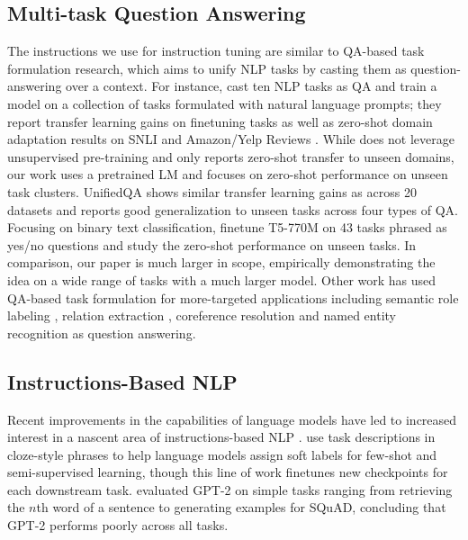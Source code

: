 \subsection{Multi-task Question Answering}
The instructions we use for instruction tuning are similar to QA-based task formulation research, which aims to unify NLP tasks by casting them as question-answering over a context.
For instance, \citet{mccann2018natural} cast ten NLP tasks as QA and train a model on a collection of tasks formulated with natural language prompts;
they report transfer learning gains on finetuning tasks as well as zero-shot domain adaptation results on SNLI \citep{bowman-etal-2015-large} and Amazon/Yelp Reviews \citep{amazonyelp2015}.
While \citet{mccann2018natural} does not leverage unsupervised pre-training and only reports zero-shot transfer to unseen domains, our work uses a pretrained LM and focuses on zero-shot performance on unseen task clusters.
UnifiedQA \citep{khashabi-etal-2020-unifiedqa} shows similar transfer learning gains as \citet{mccann2018natural} across 20 datasets and reports good generalization to unseen tasks across four types of QA. 
Focusing on binary text classification, \citet{zhong2021meta} finetune T5-770M on 43 tasks phrased as yes/no questions and study the zero-shot performance on unseen tasks. 
In comparison, our paper is much larger in scope, empirically demonstrating the idea on a wide range of tasks with a much larger model.
Other work has used QA-based task formulation for more-targeted applications including semantic role labeling \citep{he-etal-2015-question}, relation extraction \citep{levy-etal-2017-zero}, coreference resolution \citep{wu-etal-2020-corefqa} and named entity recognition \citep{li-etal-2020-unified} as question answering.

\subsection{Instructions-Based NLP}
Recent improvements in the capabilities of language models have led to increased interest in a nascent area of instructions-based NLP \citep[][and see \citet{mccarthy1960programs}]{goldwasser2014learning}.
\citet{schick-schutze-2021-exploiting} \citep[also see][]{gao-etal-2021-making,tam2021adapet} use task descriptions in cloze-style phrases to help language models assign soft labels for few-shot and semi-supervised learning, though this line of work finetunes new checkpoints for each downstream task.
\citet{efrat2020turking} evaluated GPT-2 \citep{radford2019language} on simple tasks ranging from retrieving the $n$th word of a sentence to generating examples for SQuAD, concluding that GPT-2 performs poorly across all tasks.

